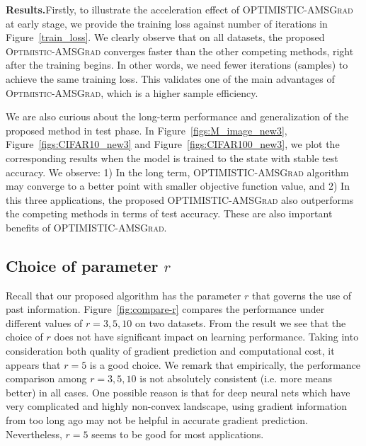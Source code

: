 \documentclass[11pt]{article}
\theoremstyle{k}
\begin{document}
\textbf{Results.}\hspace{0.1in}Firstly, to illustrate the acceleration effect of \textsc{OPTIMISTIC-AMSGrad} at early stage, we provide the training loss against number of iterations in Figure~\ref{train_loss}. We clearly observe that on all datasets, the proposed \textsc{Optimistic-AMSGrad} converges faster than the other competing methods, right after the training begins. In other words, we need fewer iterations (samples) to achieve the same training loss. This validates one of the main advantages of \textsc{Optimistic-AMSGrad}, which is a higher sample efficiency.

We are also curious about the long-term performance and generalization of the proposed method in test phase. In Figure~\ref{figs:M_image_new3}, Figure~\ref{figs:CIFAR10_new3} and Figure~\ref{figs:CIFAR100_new3}, we plot the corresponding results when the model is trained to the state with stable test accuracy. We observe: 1) In the long term, \textsc{OPTIMISTIC-AMSGrad} algorithm may converge to a better point with smaller objective function value, and 2) In this three applications, the proposed \textsc{OPTIMISTIC-AMSGrad} also outperforms the competing methods in terms of test accuracy. These are also important benefits of \textsc{OPTIMISTIC-AMSGrad}.


\subsection{Choice of parameter $r$}
Recall that our proposed algorithm has the parameter $r$ that governs the use of past information.
Figure~\ref{fig:compare-r} compares the performance under different values of $r=3,5,10$ on two datasets. From the result we see that the choice of $r$ does not have significant impact on learning performance. Taking into consideration both quality of gradient prediction and computational cost, it appears that $r=5$ is a good choice. We remark that empirically, the performance comparison among $r=3,5,10$ is not absolutely consistent (i.e. more means better) in all cases. One possible reason is that for deep neural nets which have very complicated and highly non-convex landscape, using gradient information from too long ago may not be helpful in accurate gradient prediction. Nevertheless, $r=5$ seems to be good for most applications.
\end{document}
